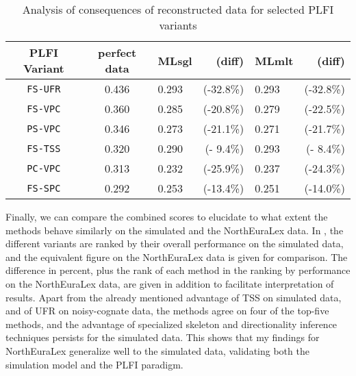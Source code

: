 \begin{table}[t]
 \centering
 \begin{tabular}{cclrlr}
 \hline \hline
PLFI Variant & perfect data & MLsgl & (diff) & MLmlt & (diff)\\ \hline
\texttt{FS-UFR} & 0.436 & 0.293 & (-32.8\%) & 0.293 & (-32.8\%)\\
\texttt{FS-VPC} & 0.360 & 0.285 & (-20.8\%) & 0.279 & (-22.5\%)\\
\texttt{PS-VPC} & 0.346 & 0.273 & (-21.1\%) & 0.271 & (-21.7\%)\\
\texttt{FS-TSS} & 0.320 & 0.290 & (- 9.4\%) & 0.293 & (- 8.4\%)\\
\texttt{PC-VPC} & 0.313 & 0.232 & (-25.9\%) & 0.237 & (-24.3\%)\\
\texttt{FS-SPC} & 0.292 & 0.253 & (-13.4\%) & 0.251 & (-14.0\%)\\
  \hline
 \end{tabular}
 \caption{Analysis of consequences of reconstructed data for selected PLFI variants}
 \label{variant-comparison-perfect-vs-reconstructed}
\end{table}

Finally, we can compare the combined scores to elucidate to what extent the methods behave similarly on the simulated and the NorthEuraLex data. In , the different variants are ranked by their overall performance on the simulated data, and the equivalent figure on the NorthEuraLex data is given for comparison. The difference in percent, plus the rank of each method in the ranking by performance on the NorthEuraLex data, are given in addition to facilitate interpretation of results. Apart from the already mentioned advantage of TSS on simulated data, and of UFR on noisy-cognate data, the methods agree on four of the top-five methods, and the advantage of specialized skeleton and directionality inference techniques persists for the simulated data. This shows that my findings for NorthEuraLex generalize well to the simulated data, validating both the simulation model and the PLFI paradigm.

